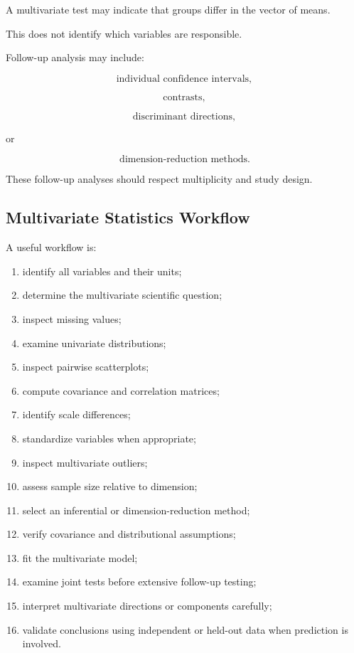 A multivariate test may indicate that groups differ in the vector of
means.

This does not identify which variables are responsible.

Follow-up analysis may include:

\[
\boxed{
\text{individual confidence intervals},
}
\]

\[
\boxed{
\text{contrasts},
}
\]

\[
\boxed{
\text{discriminant directions},
}
\]

or

\[
\boxed{
\text{dimension-reduction methods}.
}
\]

These follow-up analyses should respect multiplicity and study design.

\subsection{Multivariate Statistics Workflow}
\label{subsec:multivariate-statistics-workflow}

A useful workflow is:

\begin{enumerate}
    \item identify all variables and their units;
    \item determine the multivariate scientific question;
    \item inspect missing values;
    \item examine univariate distributions;
    \item inspect pairwise scatterplots;
    \item compute covariance and correlation matrices;
    \item identify scale differences;
    \item standardize variables when appropriate;
    \item inspect multivariate outliers;
    \item assess sample size relative to dimension;
    \item select an inferential or dimension-reduction method;
    \item verify covariance and distributional assumptions;
    \item fit the multivariate model;
    \item examine joint tests before extensive follow-up testing;
    \item interpret multivariate directions or components carefully;
    \item validate conclusions using independent or held-out data when
          prediction is involved.
\end{enumerate}


